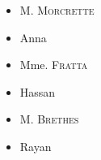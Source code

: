\documentclass[french,bookmarks]{article}
\begin{document}
    \begin{minipage}{0.3\linewidth}
        \begin{makelistright}
            \begin{itemize}
                \item[\bullet] M. \textsc{Morcrette}
                \item[\bullet] Anna
                \item[\bullet] Mme. \textsc{Fratta}
                \item[\bullet] Hassan
                \item[\bullet] M. \textsc{Brethes}
                \item[\bullet] Rayan
            \end{itemize}
        \end{makelistright}
    \end{minipage}
    \hfill
\end{document}
